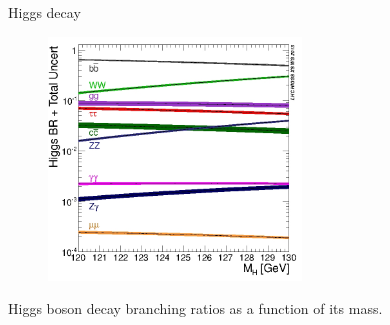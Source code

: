 \begin{frame}{Higgs decay}
\vspace{-.2cm}
\begin{figure}[!Hhtbp]
  \begin{center}
    \includegraphics[width=0.6\textwidth]{../figs/Higgs_BR_120-130.jpg}
  \end{center}
\end{figure}

\vspace{-.2cm}
    \begin{block}{}
      \tiny \centering Higgs boson decay branching ratios as a function of its mass.
    \end{block}

\end{frame}

